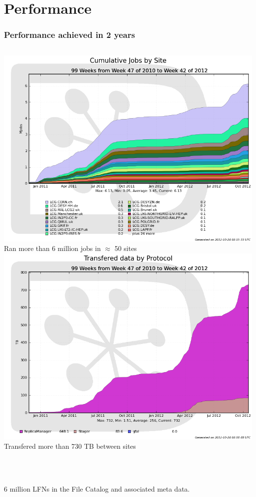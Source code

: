 \documentclass{beamer}
\begin{document}
\section{Performance}
\begin{frame}
  \frametitle{Performance achieved in 2 years}
  \begin{columns}
    \includegraphics[width=1\textwidth]{JobsPerSite.png}\\
    Ran more than 6 million jobs in $\approx$ 50 sites
    \includegraphics[width=1\textwidth]{TransferedDataPerProtocol.png}\\
    Transfered more than 730 TB between sites
  \end{columns}
~\\
~\\
6 million LFNs in the File Catalog and associated meta data.
\end{frame}
\end{document}
